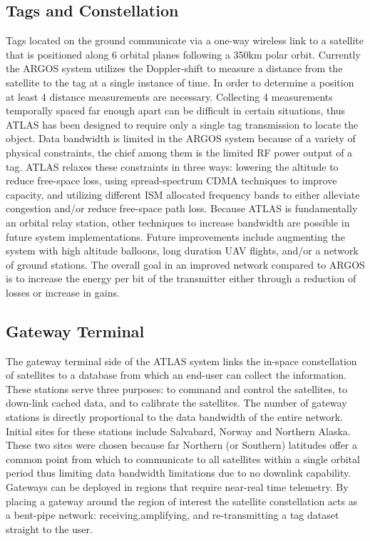 \documentclass{article}
\begin{document}
\subsection{Tags and Constellation}
Tags located on the ground communicate via a one-way wireless link to a satellite that is positioned along 6 orbital planes following a 350km polar orbit. Currently the ARGOS system utilizes the Doppler-shift to measure a distance from the satellite to the tag at a single instance of time. In order to determine a position at least 4 distance measurements are necessary. Collecting 4 measurements temporally spaced far enough apart can be difficult in certain situations, thus ATLAS has been designed to require only a single tag transmission to locate the object. Data bandwidth is limited in the ARGOS system because of a variety of physical constraints, the chief among them is the limited RF power output of a tag. ATLAS relaxes these constraints in three ways: lowering the altitude to reduce free-space loss, using spread-spectrum CDMA techniques to improve capacity, and utilizing different ISM allocated frequency bands to either alleviate congestion and/or reduce free-space path loss. Because ATLAS is fundamentally an orbital relay station, other techniques to increase bandwidth are possible in future system implementations. Future improvements include augmenting the system with high altitude balloons, long duration UAV flights, and/or a network of ground stations. The overall goal in an improved network compared to ARGOS is to increase the energy per bit of the transmitter either through a reduction of losses or increase in gains. 

\subsection{Gateway Terminal}
The gateway terminal side of the ATLAS system links the in-space constellation of satellites to a database from which an end-user can collect the information. These stations serve three purposes: to command and control the satellites, to down-link cached data, and to calibrate the satellites. The number of gateway stations is directly proportional  to the data bandwidth of the entire network. Initial sites for these stations include Salvabard, Norway and Northern Alaska. These two sites were chosen because far Northern (or Southern) latitudes offer a common point from which to communicate to all satellites within a single orbital period thus limiting data bandwidth limitations due to no downlink capability. Gateways can be deployed in regions that require near-real time telemetry. By placing a gateway around the region of interest the satellite constellation acts as a bent-pipe network: receiving,amplifying, and re-transmitting a tag dataset straight to the user.
\end{document}
